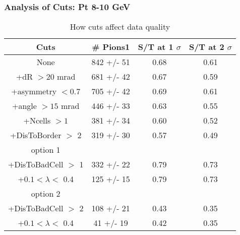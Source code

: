 \frame
{
\frametitle{Analysis of Cuts: Pt  8-10 GeV}
\begin{table}
\caption{How cuts affect data quality}
\centering
\begin{tabular}{c c c c}
\hline\hline
Cuts & \# Pions1 & S/T at 1 $\sigma$ & S/T at 2 $\sigma$ \\ [0.5ex]
\hline
None &  842 +/-   51 & 0.68 & 0.61 \\ %
+dR $> 20$ mrad &  681 +/-   42 & 0.67 & 0.59 \\ %
+asymmetry $< 0.7$ &  705 +/-   42 & 0.69 & 0.61 \\ %
+angle $> 15$ mrad &  446 +/-   33 & 0.63 & 0.55 \\ %
+Ncells $> 1$&  381 +/-   34 & 0.60 & 0.52 \\ %
+DisToBorder $>$ 2 &  319 +/-   30 & 0.57 & 0.49 \\ %
option 1\\
+DisToBadCell $>$ 1&  332 +/-   22 & 0.79 & 0.73 \\ %
+$0.1 < \lambda <$ 0.4 &  125 +/-   15 & 0.79 & 0.73 \\ %
option 2\\
+DisToBadCell $>$ 2&  108 +/-   21 & 0.43 & 0.35 \\ %
+$0.1 < \lambda <$ 0.4 &   41 +/-   19 & 0.42 & 0.35 \\ %
[1ex]
\hline
\end{tabular}
\label{table:nonlin}
\end{table}
}
